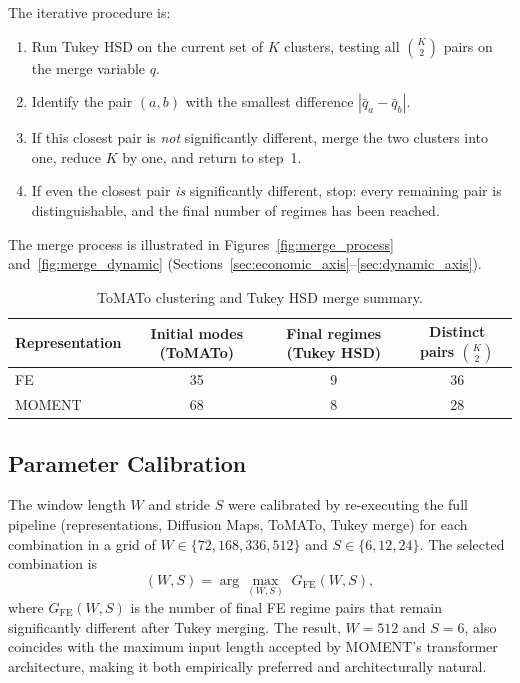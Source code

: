 \documentclass[12pt]{article}
\begin{document}
The iterative procedure is:
\begin{enumerate}[nosep]
\item Run Tukey HSD on the current set of $K$ clusters, testing all $\binom{K}{2}$ pairs on the merge variable $q$.
\item Identify the pair $(a,b)$ with the smallest difference $|\bar{q}_a - \bar{q}_b|$.
\item If this closest pair is \emph{not} significantly different, merge the two clusters into one, reduce $K$ by one, and return to step~1.
\item If even the closest pair \emph{is} significantly different, stop: every remaining pair is distinguishable, and the final number of regimes has been reached.
\end{enumerate}
The merge process is illustrated in Figures~\ref{fig:merge_process} and~\ref{fig:merge_dynamic} (Sections~\ref{sec:economic_axis}--\ref{sec:dynamic_axis}).

\begin{table}[H]
\centering
\caption{ToMATo clustering and Tukey HSD merge summary.}
\label{tab:clustering_summary}
\small
\begin{tabular}{lccc}
\toprule
Representation & Initial modes (ToMATo) & Final regimes (Tukey HSD) & Distinct pairs $\binom{K}{2}$ \\
\midrule
FE     & 35 & 9 & 36 \\
MOMENT & 68 & 8 & 28 \\
\bottomrule
\end{tabular}
\end{table}


\subsection{Parameter Calibration}
\label{sec:calibration}

The window length $W$ and stride $S$ were calibrated by re-executing the full pipeline (representations, Diffusion Maps, ToMATo, Tukey merge) for each combination in a grid of $W \in \{72, 168, 336, 512\}$ and $S \in \{6, 12, 24\}$.
The selected combination is
\begin{equation}
(W,S)
=
\arg\max_{(W,S)}
\;G_\text{FE}(W,S),
\label{eq:calibration}
\end{equation}
where $G_\text{FE}(W,S)$ is the number of final FE regime pairs that remain significantly different after Tukey merging.
The result, $W = 512$ and $S = 6$, also coincides with the maximum input length accepted by MOMENT's transformer architecture, making it both empirically preferred and architecturally natural.
\end{document}
